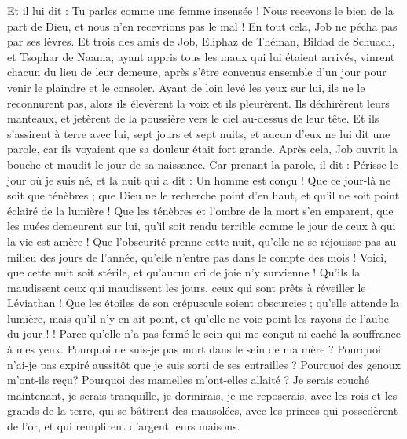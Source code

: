 \begin{multicols}{2}
Et il lui dit : Tu parles comme une femme insensée ! Nous recevons le bien de la part de Dieu, et nous n'en recevrions pas le mal ! En tout cela, Job ne pécha pas par ses lèvres.
Et trois des amis de Job, Eliphaz de Théman, Bildad de Schuach, et Tsophar de Naama, ayant appris tous les maux qui lui étaient arrivés, vinrent chacun du lieu de leur demeure, après s'être convenus ensemble d'un jour pour venir le plaindre et le consoler.
Ayant de loin levé les yeux sur lui, ils ne le reconnurent pas, alors ils élevèrent la voix et ils pleurèrent. Ils déchirèrent leurs manteaux, et jetèrent de la poussière vers le ciel au-dessus de leur tête.
Et ils s'assirent à terre avec lui, sept jours et sept nuits, et aucun d'eux ne lui dit une parole, car ils voyaient que sa douleur était fort grande.
\VerseOne{}Après cela, Job ouvrit la bouche et maudit le jour de sa naissance.
Car prenant la parole, il dit :
Périsse le jour où je suis né, et la nuit qui a dit : Un homme est conçu !
Que ce jour-là ne soit que ténèbres ; que Dieu ne le recherche point d'en haut, et qu'il ne soit point éclairé de la lumière ! 
Que les ténèbres et l'ombre de la mort s'en emparent, que les nuées demeurent sur lui, qu'il soit rendu terrible comme le jour de ceux à qui la vie est amère ! 
Que l'obscurité prenne cette nuit, qu'elle ne se réjouisse pas au milieu des jours de l'année, qu'elle n'entre pas dans le compte des mois !
Voici, que cette nuit soit stérile, et qu'aucun cri de joie n'y survienne !
Qu'ils la maudissent ceux qui maudissent les jours, ceux qui sont prêts à réveiller le Léviathan !
Que les étoiles de son crépuscule soient obscurcies ; qu'elle attende la lumière, mais qu'il n'y en ait point, et qu'elle ne voie point les rayons de l'aube du jour !  !
Parce qu'elle n'a pas fermé le sein qui me conçut ni caché la souffrance à mes yeux.
Pourquoi ne suis-je pas mort dans le sein de ma mère ? Pourquoi n'ai-je pas expiré aussitôt que je suis sorti de ses entrailles ?
Pourquoi des genoux m'ont-ils reçu? Pourquoi des mamelles m'ont-elles allaité ?
Je serais couché maintenant, je serais tranquille, je dormirais, je me reposerais,
avec les rois et les grands de la terre, qui se bâtirent des mausolées,
avec les princes qui possedèrent de l'or, et qui remplirent d'argent leurs maisons.

\end{multicols}
